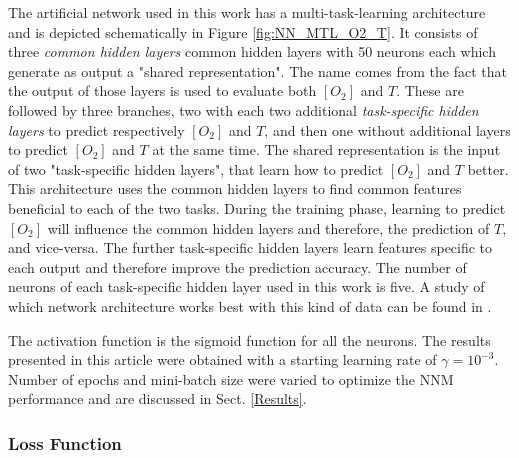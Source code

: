 \documentclass[9pt,twocolumn,twoside,pdftex]{optica}
\begin{document}
The artificial network used in this work has a multi-task-learning architecture and is depicted schematically in Figure \ref{fig:NN_MTL_O2_T}. It consists of three {\sl common hidden layers} common hidden layers with 50 neurons each which generate as output a "shared representation". The name comes from the fact that the output of those layers is used to evaluate both $[O_2]$ and $T$. These are followed by three branches, two with each two additional {\sl task-specific hidden layers} to predict respectively $[O_2]$ and $T$, and then one without additional layers to predict $[O_2]$ and $T$ at the same time. The shared representation is the input of two "task-specific hidden layers", that learn how to predict $[O_2]$ and $T$ better. This architecture uses the common hidden layers to find common features beneficial to each of the two tasks. During the training phase, learning to predict $[O_2]$ will influence the common hidden layers and therefore, the prediction of $T$, and vice-versa. The further task-specific hidden layers learn features specific to each output and therefore improve the prediction accuracy. The number of neurons of each task-specific hidden layer used in this work is five. A study of which network architecture works best with this kind of data can be found in \cite{Michelucci2019_2}.

The activation function is the sigmoid function for all the neurons. The results presented in this article were obtained with a starting learning rate of $\gamma = 10^{-3}$. Number of epochs and mini-batch size were varied to optimize the NNM performance and are discussed in Sect. \ref{Results}. 

\subsubsection{Loss Function}
\end{document}
